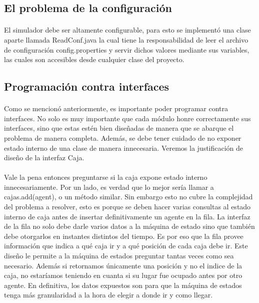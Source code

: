 \documentclass{article}
\begin{document}
\subsection{El problema de la configuración}

\paragraph{}
El simulador debe ser altamente configurable, para esto se implementó una clase aparte llamada ReadConf.java la cual tiene la responsabilidad de leer el archivo de configuración config.properties y servir dichos valores mediante sus variables, las cuales son accesibles desde cualquier clase del proyecto.

\subsection{Programación contra interfaces}

\paragraph{}
Como se mencionó anteriormente, es importante poder programar contra interfaces. No solo es muy importante que cada módulo honre correctamente sus interfaces, sino que estas estén bien diseñadas de manera que se abarque el problema de manera completa. Además, se debe tener cuidado de no exponer estado interno de una clase de manera innecesaria. Veremos la justificación de diseño de la interfaz Caja.

\paragraph{}
Vale la pena entonces preguntarse si la caja expone estado interno innecesariamente. Por un lado, es verdad que lo mejor sería llamar a cajas.add(agent), o un método similar. Sin embargo esto no cubre la complejidad del problema a resolver, esto es porque se deben hacer varias consultas al estado interno de caja antes de insertar definitivamente un agente en la fila. La interfaz de la fila no solo debe darle varios datos a la máquina de estado sino que también debe otorgarlos en instantes distintos del tiempo. Es por eso que la fila provee información que indica a qué caja ir y a qué posición de cada caja debe ir. Este diseño le permite a la máquina de estados preguntar tantas veces como sea necesario. Además si retornamos únicamente una posición y no el indice de la caja, no estaríamos teniendo en cuanta si su lugar fue ocupado antes por otro agente. En definitiva, los datos expuestos son para que la máquina de estados tenga más granularidad a la hora de elegir a donde ir y como llegar.
\end{document}
